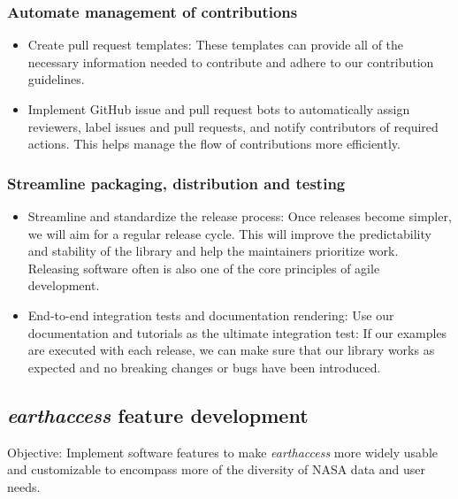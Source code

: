 \documentclass{ROSES-NASA-proposal}
\newcommand{\earthaccess}{\textit{earthaccess}\xspace} %
\begin{document}
\subsubsection{Automate management of contributions} \label{automation}
\begin{itemize}[itemsep=-.1em]
    \item Create pull request templates: These templates can provide all of the necessary information needed to contribute and adhere to our contribution guidelines.
    \item Implement GitHub issue and pull request bots to automatically assign reviewers, label issues and pull requests, and notify contributors of required actions. This helps manage the flow of contributions more efficiently.
\end{itemize}

\subsubsection{Streamline packaging, distribution and testing} \label{streamline}

\begin{itemize}[itemsep=-.1em]
    \item Streamline and standardize the release process: Once releases become simpler, we will aim for a regular release cycle. This will improve the predictability and stability of the library and help the maintainers prioritize work. Releasing software often is also one of the core principles of agile development.
    
    \item End-to-end integration tests and documentation rendering: Use our documentation and tutorials as the ultimate integration test: If our examples are executed with each release, we can make sure that our library works as expected and no breaking changes or bugs have been introduced. 
\end{itemize}

\subsection{\earthaccess feature development} \label{features}

\begin{boxC}
Objective: Implement software features to make \earthaccess more widely usable and customizable to encompass more of the diversity of NASA data and user needs.
\end{boxC}
\end{document}
